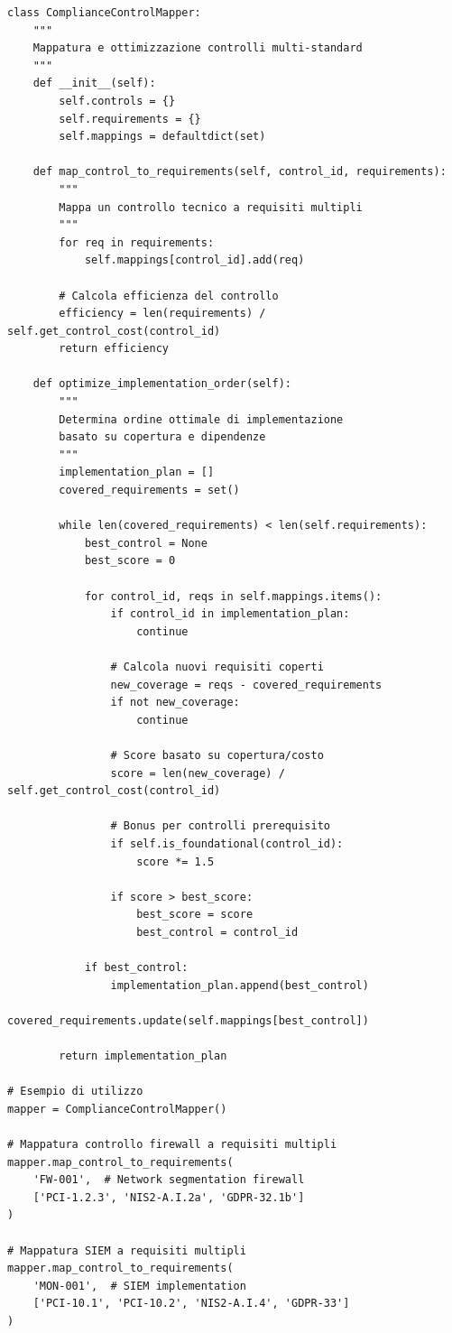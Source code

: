 \begin{lstlisting}[caption={Framework Python per Mappatura Controlli},label={lst:control_mapping}]
class ComplianceControlMapper:
    """
    Mappatura e ottimizzazione controlli multi-standard
    """
    def __init__(self):
        self.controls = {}
        self.requirements = {}
        self.mappings = defaultdict(set)
    
    def map_control_to_requirements(self, control_id, requirements):
        """
        Mappa un controllo tecnico a requisiti multipli
        """
        for req in requirements:
            self.mappings[control_id].add(req)
            
        # Calcola efficienza del controllo
        efficiency = len(requirements) / self.get_control_cost(control_id)
        return efficiency
    
    def optimize_implementation_order(self):
        """
        Determina ordine ottimale di implementazione
        basato su copertura e dipendenze
        """
        implementation_plan = []
        covered_requirements = set()
        
        while len(covered_requirements) < len(self.requirements):
            best_control = None
            best_score = 0
            
            for control_id, reqs in self.mappings.items():
                if control_id in implementation_plan:
                    continue
                    
                # Calcola nuovi requisiti coperti
                new_coverage = reqs - covered_requirements
                if not new_coverage:
                    continue
                
                # Score basato su copertura/costo
                score = len(new_coverage) / self.get_control_cost(control_id)
                
                # Bonus per controlli prerequisito
                if self.is_foundational(control_id):
                    score *= 1.5
                    
                if score > best_score:
                    best_score = score
                    best_control = control_id
            
            if best_control:
                implementation_plan.append(best_control)
                covered_requirements.update(self.mappings[best_control])
        
        return implementation_plan

# Esempio di utilizzo
mapper = ComplianceControlMapper()

# Mappatura controllo firewall a requisiti multipli
mapper.map_control_to_requirements(
    'FW-001',  # Network segmentation firewall
    ['PCI-1.2.3', 'NIS2-A.I.2a', 'GDPR-32.1b']
)

# Mappatura SIEM a requisiti multipli  
mapper.map_control_to_requirements(
    'MON-001',  # SIEM implementation
    ['PCI-10.1', 'PCI-10.2', 'NIS2-A.I.4', 'GDPR-33']
)
\end{lstlisting}

